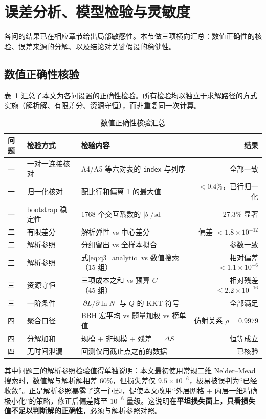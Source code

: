 \section{误差分析、模型检验与灵敏度}

各问的结果已在相应章节给出局部敏感性。本节做三项横向汇总：数值正确性的核验、误差来源的分解、以及结论对关键假设的稳健性。

\subsection{数值正确性核验}

表~\ref{tab:verify} 汇总了本文为各问设置的正确性检验。所有检验均以独立于求解路径的方式实施（解析解、有限差分、资源守恒），而非重复同一次计算。

\begin{table}[htbp]
\centering
\caption{数值正确性核验汇总}
\label{tab:verify}
\small
\begin{tabular}{l|l|l|r}
\toprule
\textbf{问题} & \textbf{检验方式} & \textbf{检验内容} & \textbf{结果} \\
\midrule
一 & 一对一连接核对 & A4/A5 等六对表的 \texttt{index} 与列序 & 全部一致 \\
一 & 归一化核对 & 配比行和偏离 1 的最大值 & $<0.4\%$，已行归一化 \\
一 & bootstrap 稳定性 & 1768 个交互系数的 $|b|/\mathrm{sd}$ & 27.3\% 显著 \\
二 & 有限差分 & 解析弹性 vs 中心差分 & 偏差 $<1.8\times10^{-12}$ \\
二 & 解析参照 & 分组留出 vs 全样本拟合 & 参数一致 \\
三 & 解析参照 & 式\eqref{eq:q3_analytic} vs 数值搜索（15 组） & 相对偏差 $<1.1\times10^{-6}$ \\
三 & 资源守恒 & 三项成本之和 vs 预算 $C$（45 组） & 相对残差 $\le2.2\times10^{-16}$ \\
三 & 一阶条件 & $|\partial L/\partial\ln N|$ 与 $Q$ 的 KKT 符号 & 全部满足 \\
四 & 聚合口径 & BBH 宏平均 vs 题量加权 vs 榜单值 & 仿射关系 $\rho=0.9979$ \\
四 & 分解加和 & 规模 $+$ 非规模 $+$ 残差 $=\Delta S$ & 恒等成立 \\
四 & 无时间泄漏 & 回测仅用截止点之前的数据 & 已核验 \\
\bottomrule
\end{tabular}
\end{table}

其中问题三的解析参照检验值得单独说明：本文最初使用常规二维 Nelder--Mead 搜索时，数值解与解析解相差 60\%，但损失差仅 $9.5\times10^{-6}$，极易被误判为``已经收敛''。正是解析参照暴露了这一问题，促使本文改用``外层网格 $+$ 内层一维精确极小化''的策略，修正后偏差降至 $10^{-6}$ 量级。这说明\textbf{在平坦损失面上，只看损失值不足以判断解的正确性}，必须与解析参照对照。

